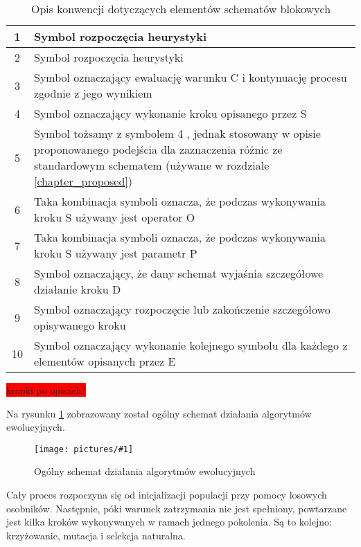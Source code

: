 \documentclass[twoside]{iisthesis}
\newcommand{\todo}{\colorbox{red}}
\newcommand{\circled}[1]{ \textcircled{\scriptsize{#1}} }
\newcommand{\img}[1]{\texttt{[image: pictures/\#1]}}
\begin{document}
\begin{table}[H]
	\caption{Opis konwencji dotyczących elementów schematów blokowych \label{table_flowchart_conventions}}
	\begin{tabularx}{\linewidth}{|c|X|}
		\hline 
		\circled{1} & Symbol rozpoczęcia heurystyki \\
		\hline
		\circled{2} & Symbol rozpoczęcia heurystyki \\
		\hline
		\circled{3} & Symbol oznaczający ewaluację warunku C i kontynuację procesu zgodnie z jego wynikiem \\
		\hline
		\circled{4} & Symbol oznaczający wykonanie kroku opisanego przez S \\
		\hline
		\circled{5} & Symbol tożsamy z symbolem \circled{4}, jednak stosowany w opisie proponowanego podejścia dla zaznaczenia różnic ze standardowym schematem (używane w rozdziale \ref{chapter_proposed})\\
		\hline
		\circled{6} & Taka kombinacja symboli oznacza, że podczas wykonywania kroku S używany jest operator O \\
		\hline
		\circled{7} & Taka kombinacja symboli oznacza, że podczas wykonywania kroku S używany jest parametr P \\
		\hline
		\circled{8} & Symbol oznaczający, że dany schemat wyjaśnia szczegółowe działanie kroku D \\
		\hline
		\circled{9} & Symbol oznaczający rozpoczęcie lub zakończenie szczegółowo opisywanego kroku \\
		\hline
		\circled{10} & Symbol oznaczający wykonanie kolejnego symbolu dla każdego z elementów opisanych przez E \\
		\hline
	\end{tabularx}
	\todo{kropki po opisach?}
\end{table}

\newpage

Na rysunku \ref{figure_ea_general} zobrazowany został ogólny schemat działania algorytmów ewolucyjnych. 

\begin{figure}
	\caption{Ogólny schemat działania algorytmów ewolucyjnych \label{figure_ea_general}}
	\img{ea_general.png}
\end{figure}

Cały proces rozpoczyna się od inicjalizacji populacji przy pomocy losowych osobników. Następnie, póki warunek zatrzymania nie jest spełniony, powtarzane jest kilka kroków wykonywanych w ramach jednego pokolenia. Są to kolejno: krzyżowanie, mutacja i selekcja naturalna.
\end{document}
